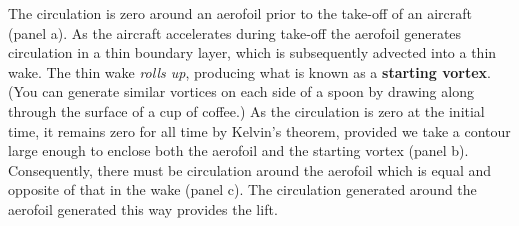 \documentclass[10pt]{report}
\begin{document}
The circulation is zero around an aerofoil prior to the take-off of an
aircraft (panel a). As the aircraft accelerates during take-off the aerofoil
generates circulation in a thin boundary layer, which is subsequently
advected into a thin wake. The thin wake \textit{rolls up}, producing what is known as a
\textbf{starting vortex}. (You can generate similar vortices on each side of
a spoon by drawing along through the surface of a cup of coffee.) As the
circulation is zero at the initial time, it remains zero for all time by
Kelvin's theorem, provided we take a contour large enough to enclose both
the aerofoil and the starting vortex (panel b). Consequently, there must be
circulation around the aerofoil which is equal and opposite of that in the
wake (panel c). The circulation generated around the aerofoil generated this
way provides the lift.

\begin{figure}
\begin{center}
\end{center}
\caption{ }
\label{fig10}
\end{figure}
\end{document}
